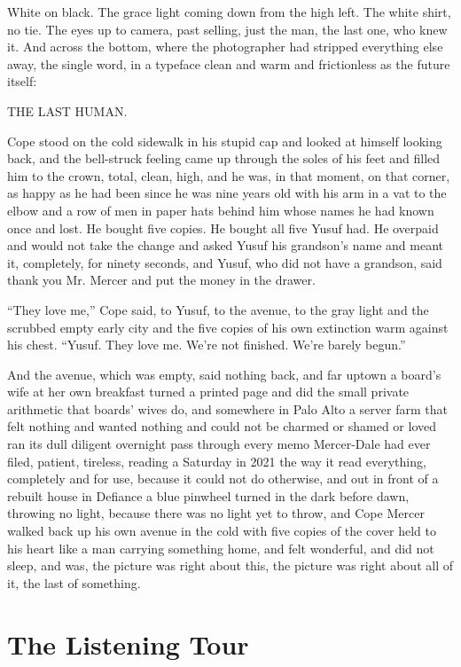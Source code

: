 \documentclass[11pt,openany]{book}
\begin{document}
White on black. The grace light coming down from the high left. The white shirt, no tie. The eyes up to camera, past selling, just the man, the last one, who knew it. And across the bottom, where the photographer had stripped everything else away, the single word, in a typeface clean and warm and frictionless as the future itself:

THE LAST HUMAN.

Cope stood on the cold sidewalk in his stupid cap and looked at himself looking back, and the bell-struck feeling came up through the soles of his feet and filled him to the crown, total, clean, high, and he was, in that moment, on that corner, as happy as he had been since he was nine years old with his arm in a vat to the elbow and a row of men in paper hats behind him whose names he had known once and lost. He bought five copies. He bought all five Yusuf had. He overpaid and would not take the change and asked Yusuf his grandson's name and meant it, completely, for ninety seconds, and Yusuf, who did not have a grandson, said thank you Mr. Mercer and put the money in the drawer.

``They love me,'' Cope said, to Yusuf, to the avenue, to the gray light and the scrubbed empty early city and the five copies of his own extinction warm against his chest. ``Yusuf. They love me. We're not finished. We're barely begun.''

And the avenue, which was empty, said nothing back, and far uptown a board's wife at her own breakfast turned a printed page and did the small private arithmetic that boards' wives do, and somewhere in Palo Alto a server farm that felt nothing and wanted nothing and could not be charmed or shamed or loved ran its dull diligent overnight pass through every memo Mercer-Dale had ever filed, patient, tireless, reading a Saturday in 2021 the way it read everything, completely and for use, because it could not do otherwise, and out in front of a rebuilt house in Defiance a blue pinwheel turned in the dark before dawn, throwing no light, because there was no light yet to throw, and Cope Mercer walked back up his own avenue in the cold with five copies of the cover held to his heart like a man carrying something home, and felt wonderful, and did not sleep, and was, the picture was right about this, the picture was right about all of it, the last of something.

\clearpage
\chapter{The Listening Tour}
\end{document}
